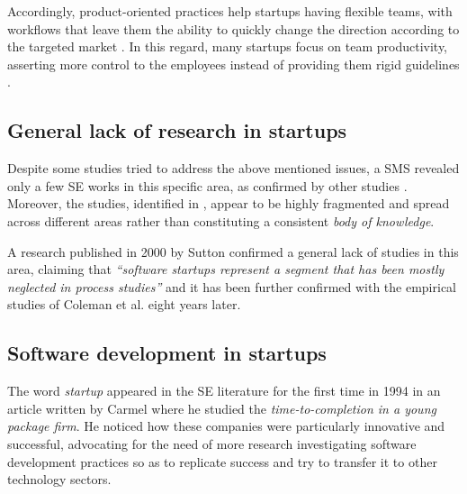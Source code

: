 \documentclass[10pt,journal,letterpaper,compsoc]{IEEEtran}
\begin{document}
Accordingly, product-oriented practices help startups having flexible teams, with workflows that leave them the ability to quickly change the direction according to the targeted market  \cite{Heitlager2007,Sutton2000}. In this regard, many startups focus on team productivity, asserting more control to the employees instead of providing them rigid guidelines \cite{Tanabian2005, Chorev2006, Kakati2003}. 

\subsection{General lack of research in startups}
Despite some studies tried to address the above mentioned issues, a SMS \cite{SMS} revealed only a few SE works in this specific area, as confirmed by other studies \cite{Coleman2008, Coleman2008a, Coleman2007, Sutton2000}. Moreover, the studies, identified in \cite{SMS}, appear to be highly fragmented and spread across different areas rather than constituting a consistent \textit{body of knowledge}.

A research published in 2000 by Sutton \cite{Sutton2000} confirmed a general lack of  studies in this area, claiming that \textit{``software startups represent a segment that has been mostly neglected in process studies''} and it has been further confirmed with the empirical studies of Coleman et al. \cite{Coleman2008,Coleman2008a,Coleman2007} eight years later.

\subsection{Software development in startups}

The word \textit{startup} appeared in the SE literature for the first time in 1994 in an article written by Carmel \cite{Camel1994a} where he studied the \textit{time-to-completion in a young package firm}. %
He noticed how these companies were particularly innovative and successful, advocating for the need of more research investigating software development practices so as to replicate success and try to transfer it to other technology sectors.
\end{document}
